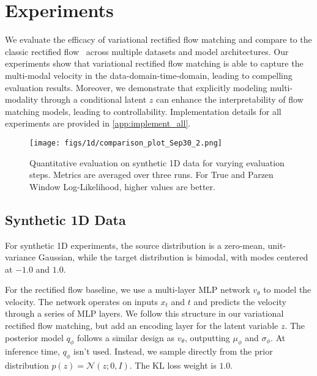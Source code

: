 \section{Experiments}
\label{sec:exp}

We evaluate the efficacy of  variational rectified flow matching and compare to the classic rectified flow~\citep{LipmanICLR2023,liu2023flow,albergo2023building} 
across multiple datasets and model architectures. %
Our experiments show that variational rectified flow matching is able to capture the multi-modal velocity in the data-domain-time-domain, leading to compelling evaluation results. %
Moreover, we demonstrate that explicitly modeling multi-modality through a conditional latent $z$ can enhance the interpretability of flow matching models, leading to  controllability. Implementation details for all experiments are provided in   \cref{app:implement_all}.


\begin{figure}[t]
    \centering
    \texttt{[image: figs/1d/comparison\_plot\_Sep30\_2.png]} \\
    \vspace{-0.5em}
    \caption{Quantitative evaluation on synthetic 1D data for varying evaluation steps. Metrics are averaged over three runs. For True and Parzen Window Log-Likelihood, higher values are better.}
    \label{fig:1d_quant_result}
    \vspace{0.5em}
\end{figure}



\subsection{Synthetic 1D Data}
\label{sec:1d_exp}


For synthetic 1D experiments, the source distribution is a zero-mean, unit-variance Gaussian, while the target distribution is bimodal, with modes centered at $-1.0$ and $1.0$. 


For the rectified flow  baseline, we use a multi-layer MLP network \(v_\theta\) to model the velocity. The network operates on inputs \(x_t\) and \(t\)  and predicts the velocity through a series of MLP layers. We follow this structure in our variational rectified flow matching, but add an encoding layer for the latent variable \(z\). The posterior model \(q_{\phi}\) follows a similar design as \(v_\theta\), outputting \(\mu_\phi\) and \(\sigma_\phi\). %
At inference time, $q_\phi$ isn't used. Instead, we sample directly from the prior distribution \(p(z) = \mathcal{N}(z; 0, I)\). The KL loss weight is $1.0$.  


